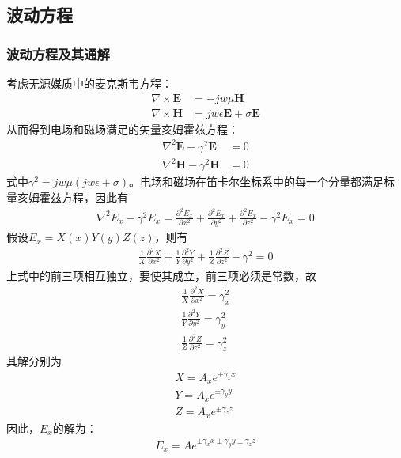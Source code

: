 \documentclass{article}
\numberwithin{equation}{section}
\begin{document}
\subsection{波动方程}
\subsubsection{波动方程及其通解}
考虑无源媒质中的麦克斯韦方程：
\begin{align}
    \label{eq:eq318}
    \nabla \times \mathbf{E}&=-jw\mu\mathbf{H} \\
    \label{eq:eq319}
    \nabla \times \mathbf{H}&=jw\epsilon\mathbf{E}+\sigma\mathbf{E}
\end{align}
从而得到电场和磁场满足的矢量亥姆霍兹方程：
\begin{align}
    \label{eq:eq320}
    \nabla^2\mathbf{E}-\gamma^2\mathbf{E}&=0 \\
    \label{eq:eq321}
    \nabla^2\mathbf{H}-\gamma^2\mathbf{H}&=0
\end{align}
式中$\gamma^2=jw\mu(jw\epsilon+\sigma)$。电场和磁场在笛卡尔坐标系中的每一个分量都满足标量亥姆霍兹方程，因此有
\begin{align}
    \label{eq:eq322}
    \nabla^2{E}_x-\gamma^2{E}_x=\frac{\partial^2E_x}{\partial x^2}+\frac{\partial^2E_x}{\partial y^2}+\frac{\partial^2E_x}{\partial z^2}-\gamma^2{E}_x=0
\end{align}
假设$E_x=X(x)Y(y)Z(z)$，则有
\begin{align}
    \label{eq:eq323}
    \frac{1}{X}\frac{\partial^2X}{\partial x^2}+\frac{1}{Y}\frac{\partial^2Y}{\partial y^2}+\frac{1}{Z}\frac{\partial^2Z}{\partial z^2}-\gamma^2=0
\end{align}
上式中的前三项相互独立，要使其成立，前三项必须是常数，故
\begin{align}
    \label{eq:eq324}
    \frac{1}{X}\frac{\partial^2X}{\partial x^2}=\gamma_x^2 \\
    \label{eq:eq325}
    \frac{1}{Y}\frac{\partial^2Y}{\partial y^2}=\gamma_y^2 \\
    \label{eq:eq326}
    \frac{1}{Z}\frac{\partial^2Z}{\partial z^2}=\gamma_z^2
\end{align}
其解分别为
\begin{align}
    \label{eq:eq327}
    X=A_xe^{\pm\gamma_xx} \\
    \label{eq:eq328}
    Y=A_xe^{\pm\gamma_yy} \\
    \label{eq:eq329}
    Z=A_xe^{\pm\gamma_zz}
\end{align}
因此，$E_x$的解为：
\begin{align}
    \label{eq:eq330}
    E_x=Ae^{\pm\gamma_xx\pm\gamma_yy\pm\gamma_zz}
\end{align}
\end{document}
